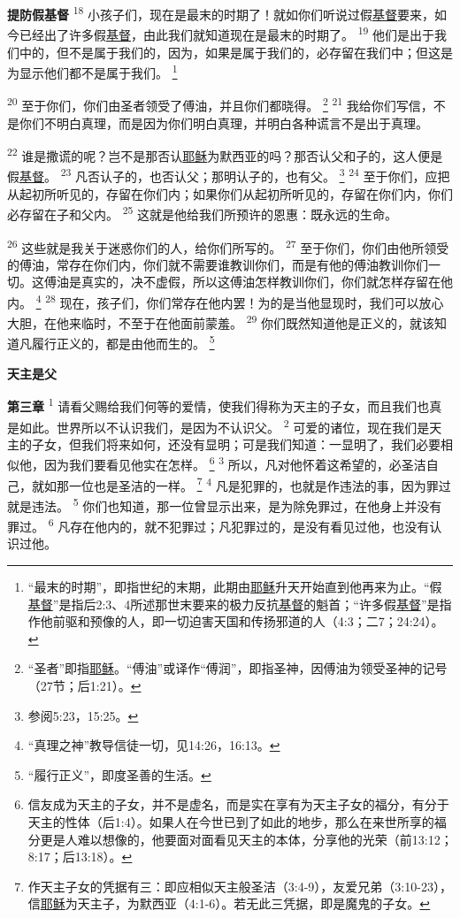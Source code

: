 \begin{multicols}{2}
\textbf{提防假基督\quad}
\textsuperscript{18}
小孩子们，现在是最末的时期了！就如你们听说过假\uline{基督}要来，如今已经出了许多假\uline{基督}，由此我们就知道现在是最末的时期了。
\textsuperscript{19}
他们是出于我们中的，但不是属于我们的，因为，如果是属于我们的，必存留在我们中；但这是为显示他们都不是属于我们。
\footnote{“最末的时期”，即指世纪的末期，此期由\uline{耶稣}升天开始直到他再来为止。“假\uline{基督}”是指后2:3、4所述那世末要来的极力反抗\uline{基督}的魁首；“许多假\uline{基督}”是指作他前驱和预像的人，即一切迫害天国和传扬邪道的人（4:3；二7；24:24）。}

\textsuperscript{20}
至于你们，你们由圣者领受了傅油，并且你们都晓得。
\footnote{“圣者”即指\uline{耶稣}。“傅油”或译作“傅润”，即指圣神，因傅油为领受圣神的记号（27节；后1:21）。}
\textsuperscript{21}
我给你们写信，不是你们不明白真理，而是因为你们明白真理，并明白各种谎言不是出于真理。

\textsuperscript{22}
谁是撒谎的呢？岂不是那否认\uline{耶稣}为默西亚的吗？那否认父和子的，这人便是假\uline{基督}。
\textsuperscript{23}
凡否认子的，也否认父；那明认子的，也有父。
\footnote{参阅5:23，15:25。}
\textsuperscript{24}
至于你们，应把从起初所听见的，存留在你们内；如果你们从起初所听见的，存留在你们内，你们必存留在子和父内。
\textsuperscript{25}
这就是他给我们所预许的恩惠：既永远的生命。

\textsuperscript{26}
这些就是我关于迷惑你们的人，给你们所写的。
\textsuperscript{27}
至于你们，你们由他所领受的傅油，常存在你们内，你们就不需要谁教训你们，而是有他的傅油教训你们一切。这傅油是真实的，决不虚假，所以这傅油怎样教训你们，你们就怎样存留在他内。
\footnote{“真理之神”教导信徒一切，见14:26，16:13。}
\textsuperscript{28}
现在，孩子们，你们常存在他内罢！为的是当他显现时，我们可以放心大胆，在他来临时，不至于在他面前蒙羞。
\textsuperscript{29}
你们既然知道他是正义的，就该知道凡履行正义的，都是由他而生的。
\footnote{“履行正义”，即度圣善的生活。}

\begin{center}
	\textbf{\large{\songti 天主是父}}
\end{center}

\textbf{第三章\quad}
\textsuperscript{1}
请看父赐给我们何等的爱情，使我们得称为天主的子女，而且我们也真是如此。世界所以不认识我们，是因为不认识父。
\textsuperscript{2}
可爱的诸位，现在我们是天主的子女，但我们将来如何，还没有显明；可是我们知道：一显明了，我们必要相似他，因为我们要看见他实在怎样。
\footnote{信友成为天主的子女，并不是虚名，而是实在享有为天主子女的福分，有分于天主的性体（后1:4）。如果人在今世已到了如此的地步，那么在来世所享的福分更是人难以想像的，他要面对面看见天主的本体，分享他的光荣（前13:12；8:17；后13:18）。}
\textsuperscript{3}
所以，凡对他怀着这希望的，必圣洁自己，就如那一位也是圣洁的一样。
\footnote{作天主子女的凭据有三：即应相似天主般圣洁（3:4-9），友爱兄弟（3:10-23），信\uline{耶稣}为天主子，为默西亚（4:1-6）。若无此三凭据，即是魔鬼的子女。}
\textsuperscript{4}
凡是犯罪的，也就是作违法的事，因为罪过就是违法。
\textsuperscript{5}
你们也知道，那一位曾显示出来，是为除免罪过，在他身上并没有罪过。
\textsuperscript{6}
凡存在他内的，就不犯罪过；凡犯罪过的，是没有看见过他，也没有认识过他。


\end{multicols}

